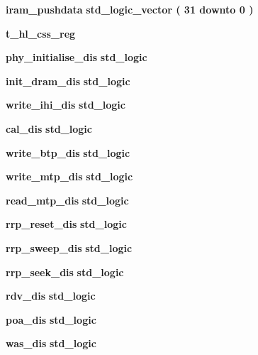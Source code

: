 \begin{DoxyCompactItemize}
\item 
{\bf iram\+\_\+pushdata} {\bfseries {\bfseries \textcolor{comment}{std\+\_\+logic\+\_\+vector}\textcolor{vhdlchar}{ }\textcolor{vhdlchar}{(}\textcolor{vhdlchar}{ }\textcolor{vhdlchar}{ } \textcolor{vhdldigit}{31} \textcolor{vhdlchar}{ }\textcolor{keywordflow}{downto}\textcolor{vhdlchar}{ }\textcolor{vhdlchar}{ } \textcolor{vhdldigit}{0} \textcolor{vhdlchar}{ }\textcolor{vhdlchar}{)}\textcolor{vhdlchar}{ }}} 
\item 
{\bf t\+\_\+hl\+\_\+css\+\_\+reg} {\bfseries  }
\item 
{\bf phy\+\_\+initialise\+\_\+dis} {\bfseries {\bfseries \textcolor{comment}{std\+\_\+logic}\textcolor{vhdlchar}{ }}} 
\item 
{\bf init\+\_\+dram\+\_\+dis} {\bfseries {\bfseries \textcolor{comment}{std\+\_\+logic}\textcolor{vhdlchar}{ }}} 
\item 
{\bf write\+\_\+ihi\+\_\+dis} {\bfseries {\bfseries \textcolor{comment}{std\+\_\+logic}\textcolor{vhdlchar}{ }}} 
\item 
{\bf cal\+\_\+dis} {\bfseries {\bfseries \textcolor{comment}{std\+\_\+logic}\textcolor{vhdlchar}{ }}} 
\item 
{\bf write\+\_\+btp\+\_\+dis} {\bfseries {\bfseries \textcolor{comment}{std\+\_\+logic}\textcolor{vhdlchar}{ }}} 
\item 
{\bf write\+\_\+mtp\+\_\+dis} {\bfseries {\bfseries \textcolor{comment}{std\+\_\+logic}\textcolor{vhdlchar}{ }}} 
\item 
{\bf read\+\_\+mtp\+\_\+dis} {\bfseries {\bfseries \textcolor{comment}{std\+\_\+logic}\textcolor{vhdlchar}{ }}} 
\item 
{\bf rrp\+\_\+reset\+\_\+dis} {\bfseries {\bfseries \textcolor{comment}{std\+\_\+logic}\textcolor{vhdlchar}{ }}} 
\item 
{\bf rrp\+\_\+sweep\+\_\+dis} {\bfseries {\bfseries \textcolor{comment}{std\+\_\+logic}\textcolor{vhdlchar}{ }}} 
\item 
{\bf rrp\+\_\+seek\+\_\+dis} {\bfseries {\bfseries \textcolor{comment}{std\+\_\+logic}\textcolor{vhdlchar}{ }}} 
\item 
{\bf rdv\+\_\+dis} {\bfseries {\bfseries \textcolor{comment}{std\+\_\+logic}\textcolor{vhdlchar}{ }}} 
\item 
{\bf poa\+\_\+dis} {\bfseries {\bfseries \textcolor{comment}{std\+\_\+logic}\textcolor{vhdlchar}{ }}} 
\item 
{\bf was\+\_\+dis} {\bfseries {\bfseries \textcolor{comment}{std\+\_\+logic}\textcolor{vhdlchar}{ }}} 

\end{DoxyCompactItemize}
